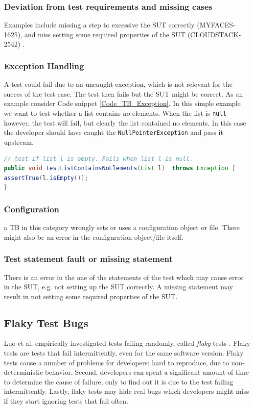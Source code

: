 \documentclass{uvamscse}
\newcommand{\Aflaky}{Luo et al.}
\begin{document}
\subsubsection{Deviation from test requirements and missing cases}
Examples include missing a step to excessive the SUT correctly (MYFACES-1625), and miss setting some required properties of the SUT (CLOUDSTACK-2542) \cite{vahabzadeh2015empirical}. 


\subsubsection{Exception Handling}
A test could fail due to an uncaught exception, which is not relevant for the succes of the test case. The test then fails but the SUT might be correct. As an example consider Code snippet \ref{Code_TB_Exception}. In this simple example we want to test whether a list contains no elements. When the list is \texttt{null} however, the test will fail, but clearly the list contained no elements. In this case the developer should have caught the \texttt{NullPointerException} and pass it upstream.

\begin{lstlisting}[language=java, caption=Exception TB, label=Code_TB_Exception]
// test if list l is empty. Fails when list l is null.
public void testListContainsNoElements(List l)  throws Exception {
assertTrue(l.isEmpty());
}
\end{lstlisting}

\subsubsection{Configuration}
a TB in this category wrongly sets or uses a configuration object or file. There might also be an error in the configuration object/file itself. 

\subsubsection{Test statement fault or missing statement}
There is an error in the one of the statements of the test which may cause error in the SUT, e.g. not setting up the SUT correctly. A missing statement may result in not setting some required properties of the SUT.

\subsection{Flaky Test Bugs}
\Aflaky{} empirically investigated tests failing randomly, called \emph{flaky} tests \cite{2014empirical}. Flaky tests are tests that fail intermittently, even for the same software version. Flaky tests cause a number of problems for developers: hard to reproduce, due to non-deterministic behavior. Second, developers can spent a significant amount of time to determine the cause of failure, only to find out it is due to the test failing intermittently. Lastly, flaky tests may hide real bugs which developers might miss if they start ignoring tests that fail often. 
\end{document}
